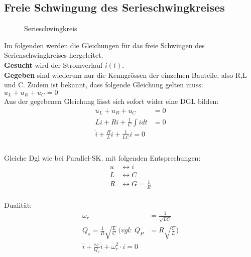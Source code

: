 \subsection{Freie Schwingung des Serieschwingkreises}

\begin{wrapfigure}{l}{0.4\textwidth}
	\centering
	
	\vspace{-0.2cm}
	\caption{Serieschwingkreis}
	\label{fig:SerieSKGeschlossen}
\end{wrapfigure}

Im folgenden werden die Gleichungen für das freie Schwingen des
Serienschwingkreises hergeleitet.\\

\textbf{Gesucht} wird der Stromverlauf
$i(t)$. \\
\textbf{Gegeben} sind wiederum nur die Kenngrössen der einzelnen Bauteile, also
R,L und C. Zudem ist bekannt, dass folgende Gleichung gelten muss: \\ $u_L +
u_R + u_C = 0$ \\


Aus der gegebenen Gleichung lässt sich sofort wider eine DGL bilden: \\
\begin{align}
	u_L + u_R + u_C &= 0\nonumber\\
	L\dot{i} + Ri + \frac{1}{C}\int{i}dt&=0\nonumber\\
	\boxed{\ddot{i}+\frac{R}{L}\dot{i}+\frac{1}{LC}i=0}
	\\
	\nonumber
\end{align}\\



Gleiche Dgl wie bei Parallel-SK. mit folgenden Entsprechungen:\\
\begin{align}
u &\leftrightarrow i\nonumber\\
L &\leftrightarrow C\nonumber\\
R &\leftrightarrow G=\frac{1}{R}\nonumber
\end{align}\\

Dualität:\\
\begin{align}
\omega_r&=\frac{1}{\sqrt{LC}}\nonumber\\
Q_s=\frac{1}{R}\sqrt{\frac{L}{C}}\ (vgl:\ Q_P&=R\sqrt{\frac{C}{L}})\nonumber\\
\boxed{\ddot i + \frac{\omega_r}{Q_s}\dot i + \omega_r^2\cdot i = 0}
\end{align}\\

